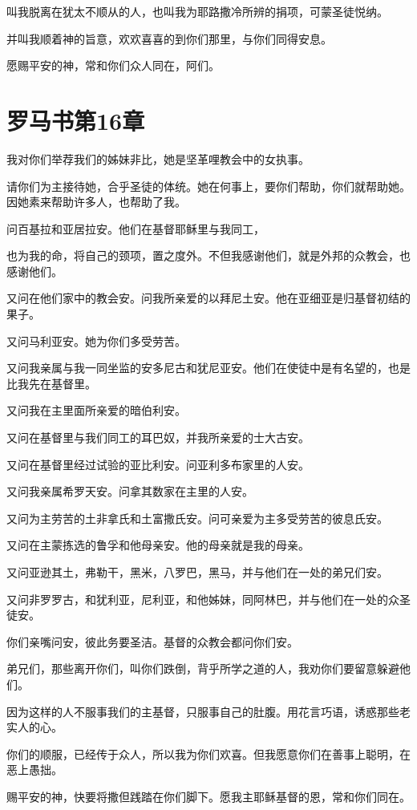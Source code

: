 \documentclass[12pt,oneside]{book}
\begin{document}
叫我脱离在犹太不顺从的人，也叫我为耶路撒冷所辨的捐项，可蒙圣徒悦纳。

并叫我顺着神的旨意，欢欢喜喜的到你们那里，与你们同得安息。

愿赐平安的神，常和你们众人同在，阿们。

\chapter{罗马书第16章}
我对你们举荐我们的姊妹非比，她是坚革哩教会中的女执事。

请你们为主接待她，合乎圣徒的体统。她在何事上，要你们帮助，你们就帮助她。因她素来帮助许多人，也帮助了我。

问百基拉和亚居拉安。他们在基督耶稣里与我同工，

也为我的命，将自己的颈项，置之度外。不但我感谢他们，就是外邦的众教会，也感谢他们。

又问在他们家中的教会安。问我所亲爱的以拜尼土安。他在亚细亚是归基督初结的果子。

又问马利亚安。她为你们多受劳苦。

又问我亲属与我一同坐监的安多尼古和犹尼亚安。他们在使徒中是有名望的，也是比我先在基督里。

又问我在主里面所亲爱的暗伯利安。

又问在基督里与我们同工的耳巴奴，并我所亲爱的士大古安。

又问在基督里经过试验的亚比利安。问亚利多布家里的人安。

又问我亲属希罗天安。问拿其数家在主里的人安。

又问为主劳苦的土非拿氏和土富撒氏安。问可亲爱为主多受劳苦的彼息氏安。

又问在主蒙拣选的鲁孚和他母亲安。他的母亲就是我的母亲。

又问亚逊其土，弗勒干，黑米，八罗巴，黑马，并与他们在一处的弟兄们安。

又问非罗罗古，和犹利亚，尼利亚，和他姊妹，同阿林巴，并与他们在一处的众圣徒安。

你们亲嘴问安，彼此务要圣洁。基督的众教会都问你们安。

弟兄们，那些离开你们，叫你们跌倒，背乎所学之道的人，我劝你们要留意躲避他们。

因为这样的人不服事我们的主基督，只服事自己的肚腹。用花言巧语，诱惑那些老实人的心。

你们的顺服，已经传于众人，所以我为你们欢喜。但我愿意你们在善事上聪明，在恶上愚拙。

赐平安的神，快要将撒但践踏在你们脚下。愿我主耶稣基督的恩，常和你们同在。
\end{document}
